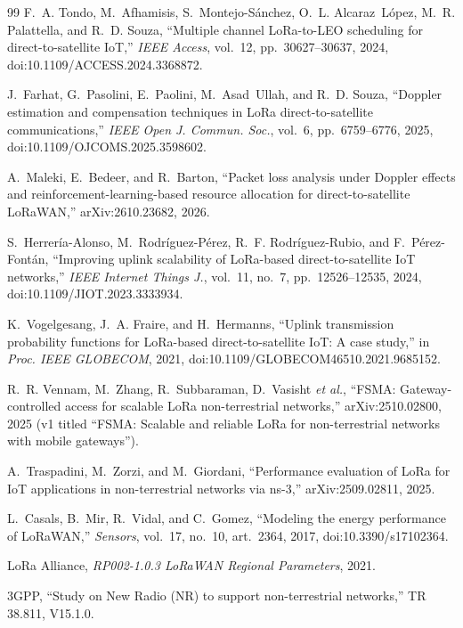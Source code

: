 \documentclass[journal]{IEEEtran}
\begin{document}
\begin{thebibliography}{99}
 F.~A. Tondo, M.~Afhamisis, S.~Montejo-S\'anchez, O.~L. Alcaraz~L\'opez, M.~R. Palattella, and R.~D. Souza, ``Multiple channel LoRa-to-LEO scheduling for direct-to-satellite IoT,'' \emph{IEEE Access}, vol.~12, pp.~30627--30637, 2024, doi:10.1109/ACCESS.2024.3368872.

 J.~Farhat, G.~Pasolini, E.~Paolini, M.~Asad~Ullah, and R.~D. Souza, ``Doppler estimation and compensation techniques in LoRa direct-to-satellite communications,'' \emph{IEEE Open J. Commun. Soc.}, vol.~6, pp.~6759--6776, 2025, doi:10.1109/OJCOMS.2025.3598602.

 A.~Maleki, E.~Bedeer, and R.~Barton, ``Packet loss analysis under Doppler effects and reinforcement-learning-based resource allocation for direct-to-satellite LoRaWAN,'' arXiv:2610.23682, 2026.

 S.~Herrer\'ia-Alonso, M.~Rodr\'iguez-P\'erez, R.~F. Rodr\'iguez-Rubio, and F.~P\'erez-Font\'an, ``Improving uplink scalability of LoRa-based direct-to-satellite IoT networks,'' \emph{IEEE Internet Things J.}, vol.~11, no.~7, pp.~12526--12535, 2024, doi:10.1109/JIOT.2023.3333934.

 K.~Vogelgesang, J.~A. Fraire, and H.~Hermanns, ``Uplink transmission probability functions for LoRa-based direct-to-satellite IoT: A case study,'' in \emph{Proc. IEEE GLOBECOM}, 2021, doi:10.1109/GLOBECOM46510.2021.9685152.

 R.~R. Vennam, M.~Zhang, R.~Subbaraman, D.~Vasisht \emph{et al.}, ``FSMA: Gateway-controlled access for scalable LoRa non-terrestrial networks,'' arXiv:2510.02800, 2025 (v1 titled ``FSMA: Scalable and reliable LoRa for non-terrestrial networks with mobile gateways'').

 A.~Traspadini, M.~Zorzi, and M.~Giordani, ``Performance evaluation of LoRa for IoT applications in non-terrestrial networks via ns-3,'' arXiv:2509.02811, 2025.

 L.~Casals, B.~Mir, R.~Vidal, and C.~Gomez, ``Modeling the energy performance of LoRaWAN,'' \emph{Sensors}, vol.~17, no.~10, art.~2364, 2017, doi:10.3390/s17102364.

 LoRa Alliance, \emph{RP002-1.0.3 LoRaWAN Regional Parameters}, 2021.

 3GPP, ``Study on New Radio (NR) to support non-terrestrial networks,'' TR 38.811, V15.1.0.


\end{thebibliography}
\end{document}
